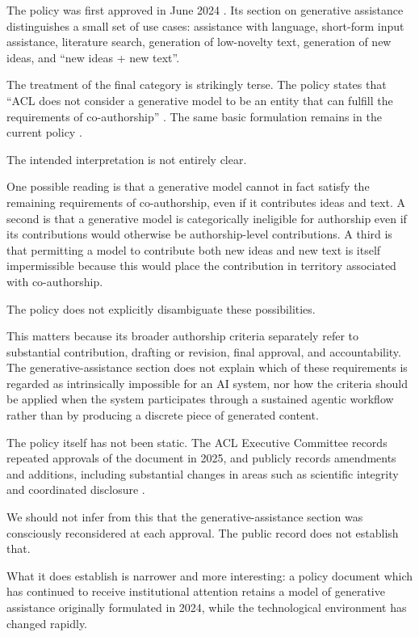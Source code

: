 The policy was first approved in June 2024 \citep{acl2024policy}. Its section on generative assistance distinguishes a small set of use cases: assistance with language, short-form input assistance, literature search, generation of low-novelty text, generation of new ideas, and ``new ideas + new text''.

The treatment of the final category is strikingly terse. The policy states that ``ACL does not consider a generative model to be an entity that can fulfill the requirements of co-authorship'' \citep{acl2024policy}. The same basic formulation remains in the current policy \citep{acl2026policy}.

The intended interpretation is not entirely clear.

One possible reading is that a generative model cannot in fact satisfy the remaining requirements of co-authorship, even if it contributes ideas and text. A second is that a generative model is categorically ineligible for authorship even if its contributions would otherwise be authorship-level contributions. A third is that permitting a model to contribute both new ideas and new text is itself impermissible because this would place the contribution in territory associated with co-authorship.

The policy does not explicitly disambiguate these possibilities.

This matters because its broader authorship criteria separately refer to substantial contribution, drafting or revision, final approval, and accountability. The generative-assistance section does not explain which of these requirements is regarded as intrinsically impossible for an AI system, nor how the criteria should be applied when the system participates through a sustained agentic workflow rather than by producing a discrete piece of generated content.

The policy itself has not been static. The ACL Executive Committee records repeated approvals of the document in 2025, and publicly records amendments and additions, including substantial changes in areas such as scientific integrity and coordinated disclosure \citep{acl2026policy,aclresolutions2025}.

We should not infer from this that the generative-assistance section was consciously reconsidered at each approval. The public record does not establish that.

What it does establish is narrower and more interesting: a policy document which has continued to receive institutional attention retains a model of generative assistance originally formulated in 2024, while the technological environment has changed rapidly.

